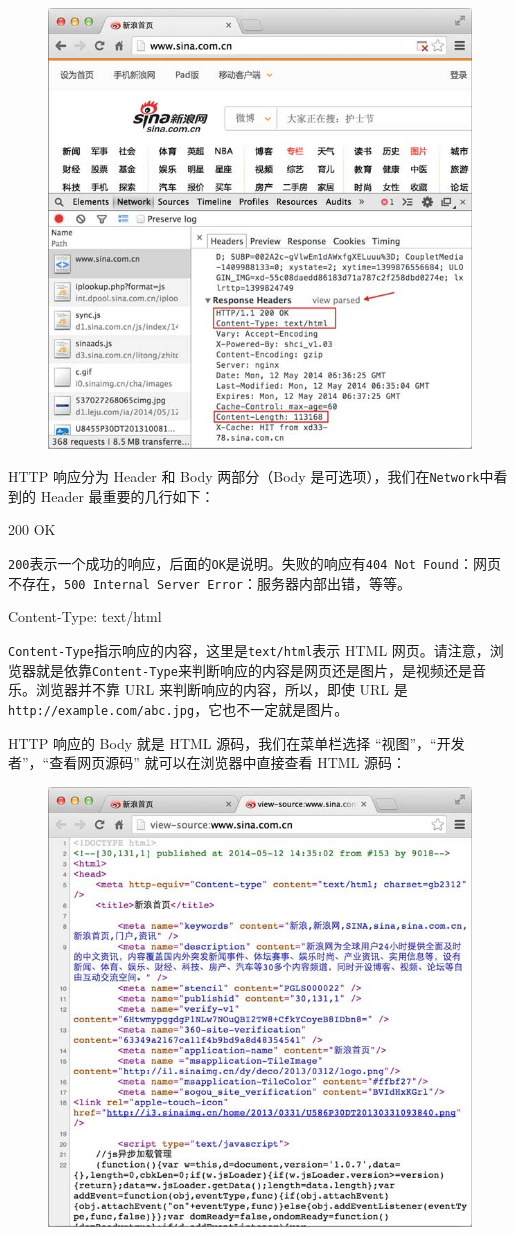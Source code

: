  
 \begin{figure}[htp]
	\centering
	\includegraphics[width=0.6\linewidth]{fig/950413553562752.png}
\end{figure}


HTTP 响应分为 Header 和 Body 两部分（Body
是可选项），我们在\texttt{Network}中看到的 Header 最重要的几行如下：

\begin{pythoncode}
200 OK
\end{pythoncode}

\texttt{200}表示一个成功的响应，后面的\texttt{OK}是说明。失败的响应有\texttt{404\ Not\ Found}：网页不存在，\texttt{500\ Internal\ Server\ Error}：服务器内部出错，等等。

\begin{pythoncode}
Content-Type: text/html
\end{pythoncode}

\texttt{Content-Type}指示响应的内容，这里是\texttt{text/html}表示 HTML
网页。请注意，浏览器就是依靠\texttt{Content-Type}来判断响应的内容是网页还是图片，是视频还是音乐。浏览器并不靠
URL 来判断响应的内容，所以，即使 URL
是\texttt{http://example.com/abc.jpg}，它也不一定就是图片。

HTTP 响应的 Body 就是 HTML 源码，我们在菜单栏选择
``视图''，``开发者''，``查看网页源码'' 就可以在浏览器中直接查看 HTML
源码：

 
 \begin{figure}[htp]
	\centering
	\includegraphics[width=0.6\linewidth]{fig/950413570828960.png}
\end{figure}


